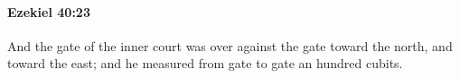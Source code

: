 
		\paragraph{Ezekiel 40:23} %
			\label{EZEKIEL-40-23}

			And the gate of the inner court was over against the gate toward the north, and toward the east; and he measured from gate to gate an hundred cubits.


